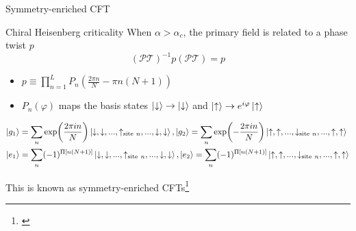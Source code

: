 \begin{frame}{Symmetry-enriched CFT}

\begin{block}{Chiral Heisenberg criticality}
    When $\alpha > \alpha_c$, the primary field is related to a phase twist $p$
    \begin{equation*}
    (\mathcal{PT})^{-1} p (\mathcal{PT}) = p
    \end{equation*}

    \begin{itemize}
        \item 
        $p \equiv \prod_{n=1}^L P_n\left(\frac{2\pi n}{N} - \pi n(N + 1) \right)$

        \item 
        $P_n(\varphi)$ maps the basis states $\ket{\downarrow} \to \ket{\downarrow}$ and $\ket{\uparrow} \to e^{i\varphi}\ket{\uparrow}$

    \end{itemize}
\end{block}

\vspace{-0.5cm}
\begin{equation*}
\begin{aligned}
    \ket{g_1} &=
    \sum_n \exp(\frac{2\pi i n}{N}) \ket{\downarrow,\downarrow, ..., \uparrow_{{\rm site~} n}, ..., \downarrow,\downarrow}, 
    \ket{g_2} =
    \sum_n \exp(-\frac{2\pi i n}{N}) \ket{\uparrow,\uparrow, ..., \downarrow_{{\rm site~} n}, ..., \uparrow,\uparrow} \\
    \ket{e_1} &=
    \sum_n (-1)^{\Pi[n(N+1)]} \ket{\downarrow,\downarrow, ..., \uparrow_{{\rm site~} n}, ..., \downarrow,\downarrow}, 
    \ket{e_2} =
    \sum_n (-1)^{\Pi[n(N+1)]} \ket{\uparrow,\uparrow, ..., \downarrow_{{\rm site~} n}, ..., \uparrow,\uparrow}
\end{aligned}
\end{equation*}

\vspace{-0.5cm}
This is known as symmetry-enriched CFTs\footnote[frame]{\cite{verresen2021gapless}}

\end{frame}
